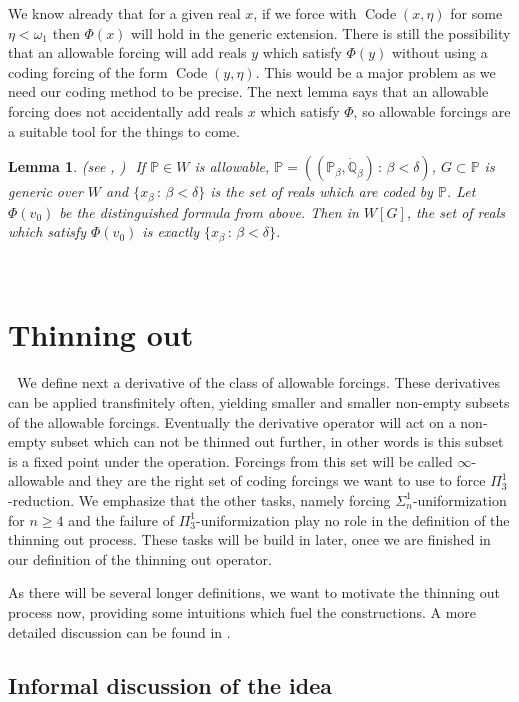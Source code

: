 \documentclass[a4paper,11pt]{article}
\newtheorem{lemma}[theorem]{Lemma}
\newcommand{\forceP}{\mathbb{P}}
\newcommand{\forceQ}{\mathbb{Q}}
\begin{document}
We know already that for a given real $x$, if we force with $\operatorname{Code} (x,\eta)$ for some $\eta < \omega_1$ then
$\Phi(x)$ will hold in the generic extension. There is still the possibility that 
an allowable forcing will add reals $y$ which satisfy $\Phi(y)$ without using a coding forcing of the form $\operatorname{Code} (y,\eta)$. This would be a major problem as we need our coding method to be precise.
     The next lemma says that an allowable forcing does not accidentally add reals $x$ which satisfy $\Phi$, so allowable forcings are a suitable tool for the things to come.
    
    \begin{lemma}\label{nounwantedcodes}(see \cite{Reduction}, \cite{Uniformization})
    ﻿
    If $\forceP \in W$ is allowable, $\forceP=((\forceP_{\beta}, \dot{\forceQ}_{\beta} ) \, : \, \beta < \delta)$, $G \subset \forceP$ is generic over $W$ and $\{ x_{\beta} \, : \, \beta < \delta\}$ is the set of reals which are coded by $\forceP$. Let $\Phi(v_0)$ be the distinguished formula from above. Then in $W[G]$, the set of reals which satisfy $\Phi(v_0)$ is exactly 
    $\{ x_{\beta} \, : \, \beta < \delta\}$.
    ﻿
    \end{lemma}
    ﻿
    ﻿
    ﻿
    \section{Thinning out}
    ﻿
    ﻿
    We define next a derivative of the class of allowable forcings. These derivatives can be applied transfinitely often, yielding smaller and smaller non-empty subsets of the allowable forcings. Eventually the derivative operator will act on a non-empty subset which can not be thinned out further, in other words is  this subset is a fixed point under the operation. Forcings from this set will be called $\infty$-allowable and they are the right set of coding forcings we want to use to force $\Pi^1_3$-reduction. We emphasize that the other tasks, namely forcing $\Sigma^1_n$-uniformization for $n \ge 4$ and the failure of $\Pi^1_3$-uniformization play no role in the definition of the thinning out process. These tasks will be build in later, once we are finished in our definition of the thinning out operator.


As there will be several longer definitions, we want to motivate the thinning out process now, providing some intuitions which fuel the constructions. A more detailed discussion can be found in \cite{Reduction}.


\subsection{Informal discussion of the idea}
\end{document}
